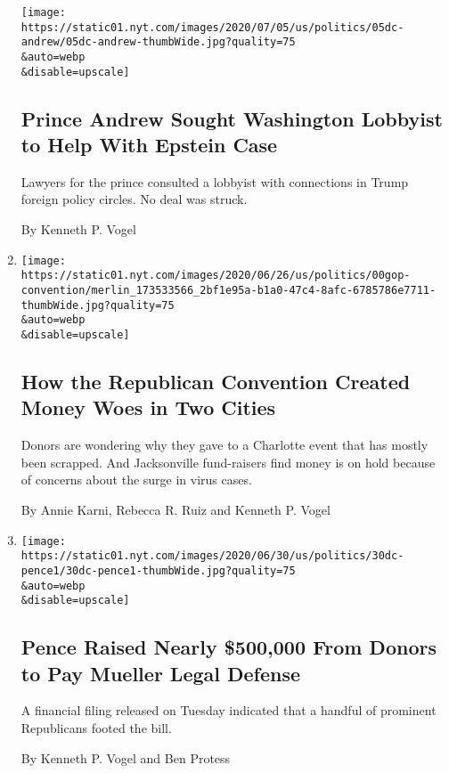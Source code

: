 \begin{enumerate}
  \texttt{[image: https://static01.nyt.com/images/2020/07/05/us/politics/05dc-andrew/05dc-andrew-thumbWide.jpg?quality=75\\\&auto=webp\\\&disable=upscale]}

  \hypertarget{prince-andrew-sought-washington-lobbyist-to-help-with-epstein-case}{%
  \subsection{Prince Andrew Sought Washington Lobbyist to Help With
  Epstein
  Case}\label{prince-andrew-sought-washington-lobbyist-to-help-with-epstein-case}}

  Lawyers for the prince consulted a lobbyist with connections in Trump
  foreign policy circles. No deal was struck.

  By Kenneth P. Vogel
\item
  \href{/2020/07/04/us/politics/republican-convention-jacksonville-charlotte.html}{}

  \texttt{[image: https://static01.nyt.com/images/2020/06/26/us/politics/00gop-convention/merlin\_173533566\_2bf1e95a-b1a0-47c4-8afc-6785786e7711-thumbWide.jpg?quality=75\\\&auto=webp\\\&disable=upscale]}

  \hypertarget{how-the-republican-convention-created-money-woes-in-two-cities}{%
  \subsection{How the Republican Convention Created Money Woes in Two
  Cities}\label{how-the-republican-convention-created-money-woes-in-two-cities}}

  Donors are wondering why they gave to a Charlotte event that has
  mostly been scrapped. And Jacksonville fund-raisers find money is on
  hold because of concerns about the surge in virus cases.

  By Annie Karni, Rebecca R. Ruiz and Kenneth P. Vogel
\item
  \href{/2020/06/30/us/politics/pence-mueller.html}{}

  \texttt{[image: https://static01.nyt.com/images/2020/06/30/us/politics/30dc-pence1/30dc-pence1-thumbWide.jpg?quality=75\\\&auto=webp\\\&disable=upscale]}

  \hypertarget{pence-raised-nearly-500000-from-donors-to-pay-mueller-legal-defense}{%
  \subsection{Pence Raised Nearly \$500,000 From Donors to Pay Mueller
  Legal
  Defense}\label{pence-raised-nearly-500000-from-donors-to-pay-mueller-legal-defense}}

  A financial filing released on Tuesday indicated that a handful of
  prominent Republicans footed the bill.

  By Kenneth P. Vogel and Ben Protess
\end{enumerate}


